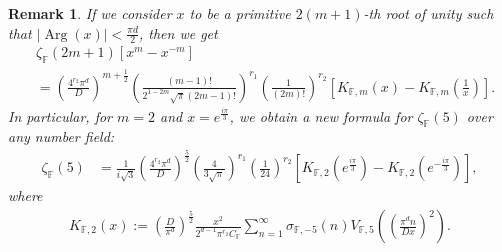 \documentclass[12pt,reqno]{amsart}
\newcommand{\Arg}{\operatorname{Arg}}
\renewcommand{\(}{\left\(}
\renewcommand{\)}{\right\)}
\renewcommand{\[}{\left\[}
\renewcommand{\]}{\right\]}
\numberwithin{equation}{section}
\theoremstyle{plain}
\newtheorem{remark}[]{Remark}
\begin{document}
\begin{remark} 
If we consider $x$ to be a primitive $2(m+1)$-th root of unity such that $|\Arg(x)| < \frac{\pi d}{2}$, then we get
\begin{align*}
& \zeta_{\mathbb{F}}(2m+1) \left[x^{m} - x^{-m}\right] \\
 &= \left( \frac{4^{r_2} \pi^d}{D}\right)^{m+\frac{1}{2}} \left( \frac{(m-1)!}{ 2^{1-2m} \sqrt{\pi} (2m-1)!} \right)^{r_1} \left(\frac{1}{(2m)!} \right)^{r_2}\left[K_{\mathbb{F}, m}(x) - K_{\mathbb{F}, m}\left(\frac{1}{x}\right)\right].
\end{align*}
In particular, for $m=2$ and $x=e^{\frac{i\pi}{3}}$, we obtain a new formula for  $\zeta_{\mathbb{F}}(5)$ over any number field:
\begin{align*}
\zeta_{\mathbb{F}}(5) &= \frac{1}{i\sqrt{3}}\left( \frac{4^{r_2} \pi^d}{D}\right)^{\frac{5}{2}} \left( \frac{4}{3\sqrt{\pi}}\right)^{r_1} \left(\frac{1}{24} \right)^{r_2}\left[K_{\mathbb{F}, 2}\left(e^{\frac{i\pi}{3}}\right) - K_{\mathbb{F}, 2}\left(e^{-\frac{i\pi}{3}}\right)\right],
\end{align*}
where
\begin{align*}
K_{\mathbb{F}, 2}(x) := \left(\frac{D}{\pi^d}\right)^{\frac{5}{2}}\frac{x^2}{2^{d-1}\pi^{r_2}C_{\mathbb{F}}}\sum_{n=1}^{\infty}\sigma_{\mathbb{F}, -5}(n)V_{\mathbb{F}, 5}\left(\left(\frac{\pi^d n}{Dx}\right)^2\right).
\end{align*}
\end{remark}
\end{document}
